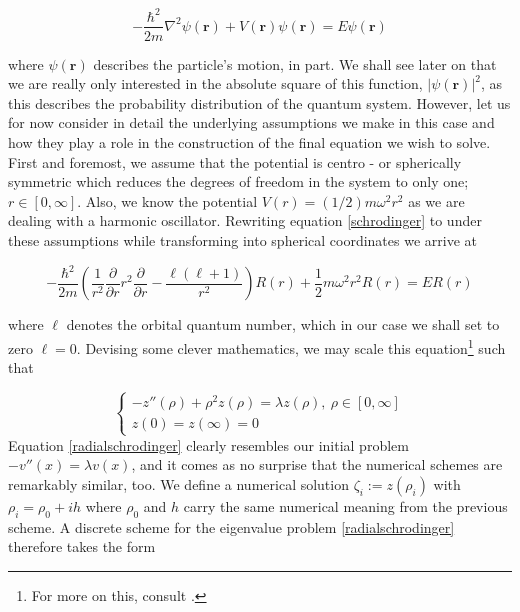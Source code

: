 	\begin{equation}
		\label{schrodinger}
		-\frac{\hbar^2}{2m}\nabla^2\psi(\mathbf{r}) + V(\mathbf{r})\psi(\mathbf{r}) = E\psi(\mathbf{r})
	\end{equation}
	
	where $\psi(\mathbf{r})$ describes the particle's motion, in part. We shall see later on that we are really only interested in the absolute square of this function, $|\psi(\mathbf{r})|^2$, as this describes the probability distribution of the quantum system. However, let us for now consider in detail the underlying assumptions we make in this case and how they play a role in the construction of the final equation we wish to solve. First and foremost, we assume that the potential is centro - or spherically symmetric which reduces the degrees of freedom in the system to only one; $r \in [0,\infty]$. Also, we know the potential $V(r) = (1/2)m\omega^2r^2$ as we are dealing with a harmonic oscillator. Rewriting equation \eqref{schrodinger} to under these assumptions while transforming into spherical coordinates we arrive at
	
	\begin{equation}
	-\frac{\hbar^2}{2m}\left(\frac{1}{r^2}\frac{\partial}{\partial r}r^2\frac{\partial}{\partial r}-\frac{\ell(\ell+1)}{r^2}\right)R(r) + \frac{1}{2}m\omega^2r^2R(r) = ER(r)
	\end{equation}
	
	where $\ell$ denotes the orbital quantum number, which in our case we shall set to zero $\ell = 0$. Devising some clever mathematics, we may scale this equation\footnote{For more on this, consult \href{https://github.com/CompPhysics/ComputationalPhysics/blob/master/doc/Projects/2020/Project2/pdf/Project2.pdf}{}.} such that
	
	\begin{equation}
		\label{radialschrodinger}
		\begin{cases}
		-z''(\rho) + \rho^2z(\rho) = \lambda z(\rho), \ \rho \in [0,\infty]\\
		z(0) = z(\infty) = 0
		\end{cases}
	\end{equation}
	Equation \eqref{radialschrodinger} clearly resembles our initial problem $-v''(x) = \lambda v(x)$, and it comes as no surprise that the numerical schemes are remarkably similar, too. We define a numerical solution $\zeta_i := z(\rho_i)$ with $\rho_i = \rho_0 + ih$ where $\rho_0$ and $h$ carry the same numerical meaning from the previous scheme.
	A discrete scheme for the eigenvalue problem \eqref{radialschrodinger} therefore takes the form
	
